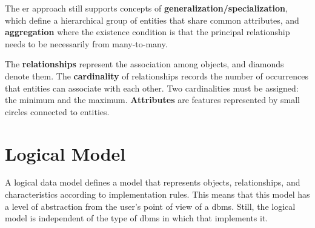 The \ac{er} approach still supports concepts of \textbf{generalization/specialization}, which define a hierarchical group of entities that share common attributes, and \textbf{aggregation} where the existence condition is that the principal relationship needs to be necessarily from many-to-many.

The \textbf{relationships} represent the association among objects, and diamonds denote them.
The \textbf{cardinality} of relationships records the number of occurrences that entities can associate with each other.
Two cardinalities must be assigned: the minimum and the maximum. \textbf{Attributes} are features represented by small circles connected to entities.

\section{Logical Model}
\label{sec_back:logicalModel}

A logical data model defines a model that represents objects, relationships, and characteristics according to implementation rules.
This means that this model has a level of abstraction from the user's point of view of a \ac{dbms}.
Still, the logical model is independent of the type of \ac{dbms} in which that implements it.

